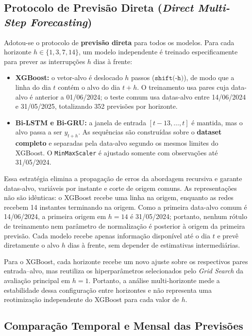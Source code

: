 \subsection{Protocolo de Previsão Direta (\textit{Direct Multi-Step Forecasting})}

Adotou-se o protocolo de \textbf{previsão direta} para todos os modelos. Para cada horizonte $h \in \{1, 3, 7, 14\}$, um modelo independente é treinado especificamente para prever as interrupções $h$ dias à frente:

\begin{itemize}
    \item \textbf{XGBoost:} o vetor-alvo é deslocado $h$ passos ($\texttt{shift(-h)}$), de modo que a linha do dia $t$ contém o alvo do dia $t+h$. O treinamento usa pares cuja data-alvo é anterior a 01/06/2024; o teste comum usa datas-alvo entre 14/06/2024 e 31/05/2025, totalizando 352 previsões por horizonte.
    \item \textbf{Bi-LSTM e Bi-GRU:} a janela de entrada $[t{-}13, \ldots, t]$ é mantida, mas o alvo passa a ser $y_{t+h}$. As sequências são construídas sobre o \textbf{dataset completo} e separadas pela data-alvo segundo os mesmos limites do XGBoost. O \texttt{MinMaxScaler} é ajustado somente com observações até 31/05/2024.
\end{itemize}

Essa estratégia elimina a propagação de erros da abordagem recursiva e garante datas-alvo, variáveis por instante e corte de origem comuns. As representações não são idênticas: o XGBoost recebe uma linha na origem, enquanto as redes recebem 14 instantes terminando na origem. Como a primeira data-alvo comum é 14/06/2024, a primeira origem em $h=14$ é 31/05/2024; portanto, nenhum rótulo de treinamento nem parâmetro de normalização é posterior à origem da primeira previsão. Cada modelo recebe apenas informação disponível até o dia $t$ e prevê diretamente o alvo $h$ dias à frente, sem depender de estimativas intermediárias.

Para o XGBoost, cada horizonte recebe um novo ajuste sobre os respectivos pares entrada--alvo, mas reutiliza os hiperparâmetros selecionados pelo \textit{Grid Search} da avaliação principal em $h=1$. Portanto, a análise multi-horizonte mede a estabilidade dessa configuração entre horizontes e não representa uma reotimização independente do XGBoost para cada valor de $h$.

\subsection{Comparação Temporal e Mensal das Previsões}

